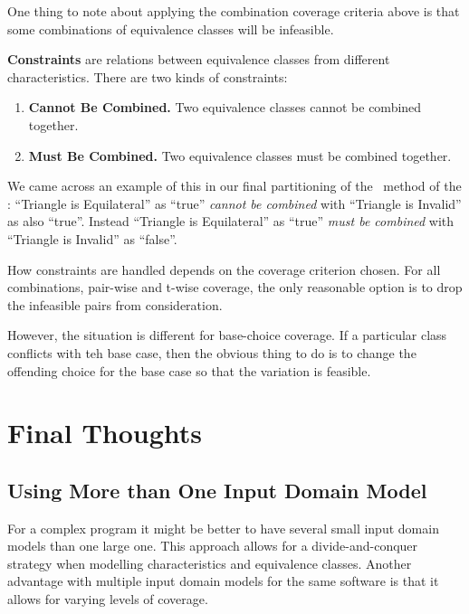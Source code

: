 One thing to note about applying the combination coverage criteria above is that
some combinations of equivalence classes will be infeasible. 

{\bf Constraints} are relations between equivalence classes from different
characteristics. There are two kinds of constraints:

\begin{enumerate}

    \item {\bf Cannot Be Combined.} Two equivalence classes cannot be combined
    together. 
   
    \item {\bf Must Be Combined.} Two equivalence classes must be combined
    together.

\end{enumerate}

We came across an example of this in our final partitioning of the
\classifymethod~method of the \triangleclass: ``Triangle is Equilateral'' as
``true'' {\it cannot be combined} with ``Triangle is Invalid'' as also ``true''.
Instead ``Triangle is Equilateral'' as ``true'' {\it must be combined} with
``Triangle is Invalid'' as ``false''.

How constraints are handled depends on the coverage criterion chosen. For all
combinations, pair-wise and t-wise coverage, the only reasonable option is to
drop the infeasible pairs from consideration. 

However, the situation is different for base-choice coverage. If a particular
class conflicts with teh base case, then the obvious thing to do is to change
the offending choice for the base case so that the variation is feasible. 

\section{Final Thoughts}

\subsection{Using More than One Input Domain Model}


For a complex program it might be better to have several small input domain
models than one large one. This approach allows for a divide-and-conquer
strategy when modelling characteristics and equivalence classes. Another
advantage with multiple input domain models for the same software is that it
allows for varying levels of coverage.

